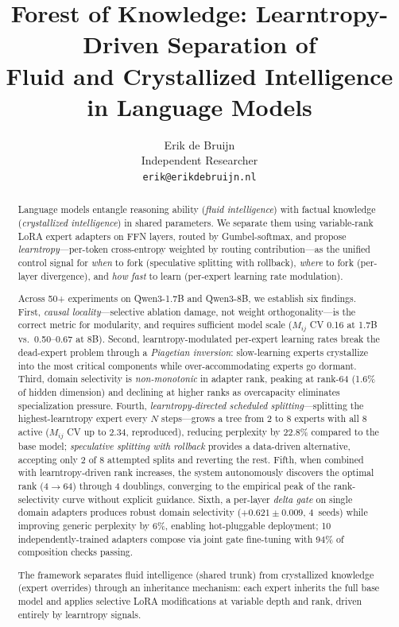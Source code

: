 \documentclass{article}
\title{Forest of Knowledge: Learntropy-Driven Separation of \\ Fluid and Crystallized Intelligence in Language Models}
\author{
  Erik de Bruijn \\
  Independent Researcher \\
  \texttt{erik@erikdebruijn.nl}
}
\begin{document}
\maketitle

\begin{abstract}
Language models entangle reasoning ability (\emph{fluid intelligence}) with
factual knowledge (\emph{crystallized intelligence}) in shared parameters.
We separate them using variable-rank LoRA expert adapters on FFN layers,
routed by Gumbel-softmax, and propose \emph{learntropy}---per-token
cross-entropy weighted by routing contribution---as the unified control
signal for \emph{when} to fork (speculative splitting with rollback), \emph{where} to fork
(per-layer divergence), and \emph{how fast} to learn (per-expert learning
rate modulation).

Across 50+ experiments on Qwen3-1.7B and Qwen3-8B, we establish six
findings. First, \emph{causal locality}---selective ablation damage, not
weight orthogonality---is the correct metric for modularity, and requires
sufficient model scale ($M_{ij}$ CV 0.16 at 1.7B vs.\ 0.50--0.67 at 8B).
Second, learntropy-modulated per-expert learning rates break the
dead-expert problem through a \emph{Piagetian inversion}: slow-learning
experts crystallize into the most critical components while
over-accommodating experts go dormant. Third, domain selectivity is
\emph{non-monotonic} in adapter rank, peaking at rank-64 (1.6\% of hidden
dimension) and declining at higher ranks as overcapacity eliminates
specialization pressure. Fourth, \emph{learntropy-directed scheduled
splitting}---splitting the highest-learntropy expert every $N$ steps---grows
a tree from 2 to 8 experts with all 8 active ($M_{ij}$ CV up to 2.34,
reproduced), reducing perplexity by 22.8\% compared to the base model;
\emph{speculative splitting with rollback} provides a data-driven
alternative, accepting only 2 of 8 attempted splits and reverting the rest.
Fifth, when combined with learntropy-driven rank increases, the system
autonomously discovers the optimal rank (4$\to$64) through 4 doublings,
converging to the empirical peak of the rank-selectivity curve without
explicit guidance. Sixth, a per-layer \emph{delta gate} on single domain
adapters produces robust domain selectivity ($+0.621 \pm 0.009$, 4~seeds)
while improving generic perplexity by 6\%, enabling hot-pluggable deployment;
10 independently-trained adapters compose via joint gate fine-tuning with
94\% of composition checks passing.

The framework separates fluid intelligence (shared trunk) from crystallized
knowledge (expert overrides) through an inheritance mechanism: each expert
inherits the full base model and applies selective LoRA modifications at
variable depth and rank, driven entirely by learntropy signals.
\end{abstract}
\end{document}
